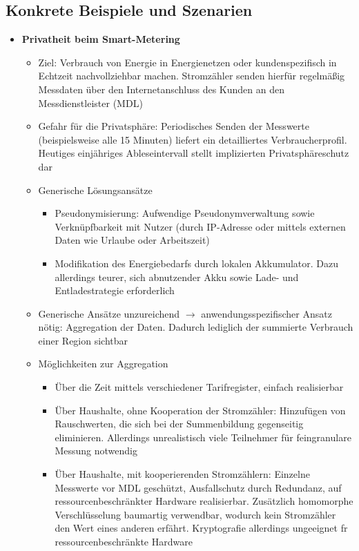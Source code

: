 \subsection{Konkrete Beispiele und Szenarien}
\begin{itemize}
	\item \textbf{Privatheit beim Smart-Metering}
	\begin{itemize}
		\item Ziel: Verbrauch von Energie in Energienetzen oder kundenspezifisch in Echtzeit nachvollziehbar machen. Stromzähler senden hierfür regelmäßig Messdaten über den Internetanschluss des Kunden an den Messdienstleister (MDL)
		\item Gefahr für die Privatsphäre: Periodisches Senden der Messwerte (beispielsweise alle 15 Minuten) liefert ein detailliertes Verbraucherprofil. Heutiges einjähriges Ableseintervall stellt implizierten Privatsphäreschutz dar
		\item Generische Lösungsansätze
		\begin{itemize}
			\item Pseudonymisierung: Aufwendige Pseudonymverwaltung sowie Verknüpfbarkeit mit Nutzer (durch IP-Adresse oder mittels externen Daten wie Urlaube oder Arbeitszeit)
			\item Modifikation des Energiebedarfs durch lokalen Akkumulator. Dazu allerdings teurer, sich abnutzender Akku sowie Lade- und Entladestrategie erforderlich
		\end{itemize}
		\item Generische Ansätze unzureichend \(\rightarrow\) anwendungsspezifischer Ansatz nötig: Aggregation der Daten. Dadurch lediglich der summierte Verbrauch einer Region sichtbar
		\item Möglichkeiten zur Aggregation
		\begin{itemize}
			\item Über die Zeit mittels verschiedener Tarifregister, einfach realisierbar
			\item Über Haushalte, ohne Kooperation der Stromzähler: Hinzufügen von Rauschwerten, die sich bei der Summenbildung gegenseitig eliminieren. Allerdings unrealistisch viele Teilnehmer für feingranulare Messung notwendig
			\item Über Haushalte, mit kooperierenden Stromzählern: Einzelne Messwerte vor MDL geschützt, Ausfallschutz durch Redundanz, auf ressourcenbeschränkter Hardware realisierbar. Zusätzlich homomorphe Verschlüsselung baumartig verwendbar, wodurch kein Stromzähler den Wert eines anderen erfährt. Kryptografie allerdings ungeeignet fr ressourcenbeschränkte Hardware

\end{itemize}
\end{itemize}
\end{itemize}
